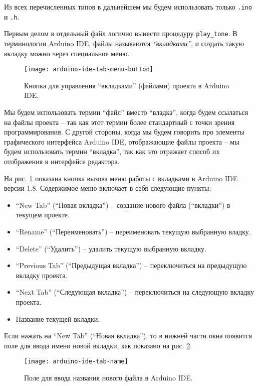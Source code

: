 \documentclass[../sparc.tex]{subfiles}
\begin{document}
Из всех перечисленных типов в дальнейшем мы будем использовать только
\texttt{.ino} и \texttt{.h}.

Первым делом в отдельный файл логично вынести процедуру
\texttt{play_tone}.  В терминологии Arduino IDE, файлы называются
\emph{``вкладками''}, и создать такую вкладку можно через специальное меню.

\begin{figure}[ht]
  \centering
  \texttt{[image: arduino-ide-tab-menu-button]}
  \caption{Кнопка для управления ``вкладками'' (файлами) проекта в Arduino IDE.}
  \label{fig:arduino-ide-tab-menu-button}
\end{figure}

Мы будем использовать термин ``файл'' вместо ``владка'', когда будем ссылаться
на файлы проекта -- так как этот термин более стандартный с точки зрения
программирования.  С другой стороны, когда мы будем говорить про элементы
графического интерфейса Arduino IDE, отображающие файлы проекта -- мы будем
использовать термин ``вкладка'', так как это отражает способ их отображения в
интерфейсе редактора.

На рис. \ref{fig:arduino-ide-tab-menu-button} показана кнопка вызова меню работы
с вкладками в Arduino IDE версии 1.8.  Содержимое меню включает в себя следующие
пункты:

\begin{itemize}
\item ``New Tab'' (``Новая вкладка'') -- создание нового файла (``вкладки'') в
  текущем проекте.
\item ``Rename'' (``Переименовать'') -- переименовать текущую выбранную владку.
\item ``Delete'' (``Удалить'') -- удалить текущую выбранную вкладку.
\item ``Previous Tab'' (``Предыдущая вкладка'') -- переключиться на предыдущую
  вкладку проекта.
\item ``Next Tab'' (``Следующая вкладка'') -- переключиться на следующую вкладку
  проекта.
\item Название текущей вкладки.
\end{itemize}

Если нажать на ``New Tab'' (``Новая вкладка''), то в нижней части окна появится
поле для ввода имени новой вкладки, как показано на
рис. \ref{fig:arduino-ide-tab-name}.

\begin{figure}[H]
  \centering
  \texttt{[image: arduino-ide-tab-name]}
  \caption{Поле для ввода названия нового файла в Arduino IDE.}
  \label{fig:arduino-ide-tab-name}
\end{figure}
\end{document}
